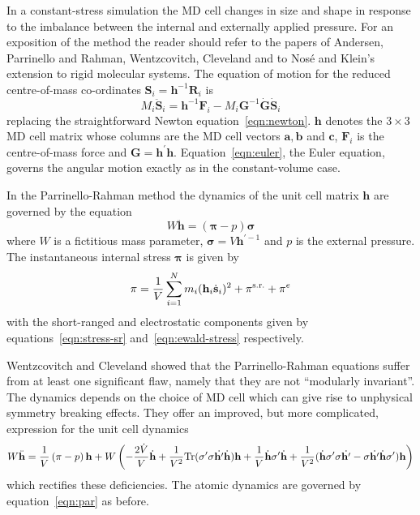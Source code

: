\documentclass[a4paper,twoside]{report}
\providecommand{\bm}[1]{\mathbf{#1}}
\begin{document}
In a constant-stress simulation the MD cell changes in size and shape
in response to the imbalance between the internal and externally
applied pressure.  For an exposition of the method the reader should
refer to the papers of Andersen\cite{andersen:80}, Parrinello and
Rahman\cite{parrinello:81}, Wentzcovitch\cite{wentzcovitch:91},
Cleveland\cite{cleveland:88} and to Nos\'{e} and Klein's extension to
rigid molecular systems\cite{nose:83}.  The equation of motion for the
reduced centre-of-mass co-ordinates $\bm{S}_i = \bm{h}^{-1}\bm{R}_i$
is
\begin{equation}
\label{eqn:par}
M_i\ddot{\bm{S}}_i = \bm{h}^{-1} \bm{F}_i - M_i \bm{G}^{-1}\dot{\bm{G}}\dot{\bm{S}}_i
\end{equation}
replacing the straightforward Newton equation~\ref{eqn:newton}.
$\bm{h}$ denotes the $3 \times 3$ MD cell matrix whose columns are
the MD cell vectors $\bm{a}, \bm{b}$ and $\bm{c}$, $\bm{F}_i$ is the
centre-of-mass force and $\bm{G} =\bm{h^\prime h}$.
Equation~\ref{eqn:euler}, the Euler equation, governs the angular
motion exactly as in the constant-volume case.

In the Parrinello-Rahman method the dynamics of the unit cell matrix
$\bm{h}$ are governed by the equation
\begin{equation}
\label{eqn:rahman}
W\ddot{\bm{h}} = \left ( \bm{\pi} - p \right ) \bm{\sigma}
\end{equation}
where $W$ is a fictitious mass parameter, $\bm{\sigma} = V
\bm{h}^{\prime-1}$ and $p$ is the external pressure.  The
instantaneous internal stress $\bm{\pi}$ is given by 
\begin{equation}
\label{eqn:prstress}
\bm{\pi} = \frac{1}{V}\sum_{i=1}^N m_i (\bm{h}_i\dot{\bm{s}}_i)^2 +
\bm{\pi}^{\textnormal{s.r.}} + \bm{\pi}^e 
\end{equation}
with the short-ranged and electrostatic components given by
equations~\ref{eqn:stress-sr} and~\ref{eqn:ewald-stress} respectively.

Wentzcovitch\cite{wentzcovitch:91} and Cleveland\cite{cleveland:88}
showed that the Parrinello-Rahman equations suffer from at least one
significant flaw, namely that they are not ``modularly invariant''.
The dynamics depends on the choice of MD cell which can give rise
to unphysical symmetry breaking effects.  They offer an improved, but
more complicated, expression for the unit cell dynamics
\begin{equation}
  \label{eqn:wentzcovitch}
  W\ddot{\bm{h}} = \frac{1}{V}\left ( \bm{\pi} - p \right ) \bm{h} + W
  \left (
    -\frac{2 \dot{V}}{V} \dot{\bm{h}} + \frac{1}{V^2}\textnormal{Tr}(\bm{\sigma'} \bm{\sigma}
      \dot{\bm{h'}} \dot{\bm{h}} ) \bm{h} + \frac{1}{V} \dot{\bm{h}} \bm{\sigma'} \dot{\bm{h}}
      + \frac{1}{V^2} ( \dot{\bm{h}} \bm{\sigma' \sigma} \dot{\bm{h'}} - \bm{\sigma} \dot{\bm{h'}}
      \dot{\bm{h}} \bm{\sigma'}) \bm{h}
  \right )
\end{equation}
which rectifies these deficiencies.  The atomic dynamics are governed
by equation~\ref{eqn:par} as before.
\end{document}
